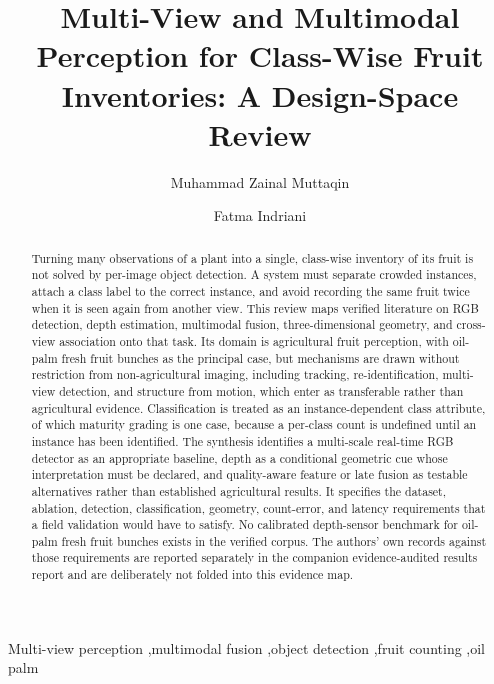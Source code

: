 \documentclass[review]{elsarticle}
\begin{document}
\begin{frontmatter}
\title{Multi-View and Multimodal Perception for Class-Wise Fruit Inventories: A Design-Space Review}
\author[a]{Muhammad Zainal Muttaqin}
\author[a]{Fatma Indriani}
\begin{abstract}
Turning many observations of a plant into a single, class-wise inventory of its
fruit is not solved by per-image object detection. A system must separate
crowded instances, attach a class label to the correct instance, and avoid
recording the same fruit twice when it is seen again from another view. This
review maps verified literature on RGB detection, depth estimation, multimodal
fusion, three-dimensional geometry, and cross-view association onto that task.
Its domain is agricultural fruit perception, with oil-palm fresh fruit bunches
as the principal case, but mechanisms are drawn without restriction from
non-agricultural imaging, including tracking, re-identification, multi-view
detection, and structure from motion, which enter as transferable rather than
agricultural evidence. Classification is treated as an instance-dependent class
attribute, of which maturity grading is one case, because a per-class count is
undefined until an instance has been identified. The synthesis identifies a
multi-scale real-time RGB detector as an appropriate baseline, depth as a
conditional geometric cue whose interpretation must be declared, and
quality-aware feature or late fusion as testable alternatives rather than
established agricultural results. It specifies the dataset, ablation, detection,
classification, geometry, count-error, and latency requirements that a field
validation would have to satisfy. No calibrated depth-sensor benchmark for
oil-palm fresh fruit bunches exists in the verified corpus. The authors' own
records against those requirements are reported separately in the companion
evidence-audited results report and are deliberately not folded into this
evidence map.
\end{abstract}
\begin{keyword}Multi-view perception \sep multimodal fusion \sep object detection \sep fruit counting \sep oil palm\end{keyword}
\end{frontmatter}




\end{document}
